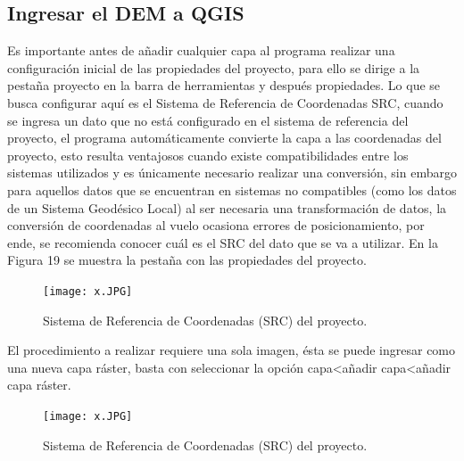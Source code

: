 \documentclass[12pt,hidelinks]{article}
\begin{document}
\subsection{Ingresar el DEM a QGIS}
Es importante antes de añadir cualquier capa al programa realizar una configuración inicial de las propiedades del proyecto, para ello se dirige a la pestaña proyecto en la barra de herramientas y después propiedades. Lo que se busca configurar aquí es el Sistema de Referencia de Coordenadas SRC, cuando se ingresa un dato que no está configurado en el sistema de referencia del proyecto, el programa automáticamente convierte la capa a las coordenadas del proyecto, esto resulta ventajosos cuando existe compatibilidades entre los sistemas utilizados y es únicamente necesario
realizar una conversión, sin embargo para aquellos datos que se encuentran en sistemas no compatibles (como los datos de un Sistema Geodésico Local) al ser necesaria una transformación de datos, la conversión de coordenadas al vuelo ocasiona errores de posicionamiento, por ende, se recomienda conocer cuál es el SRC del dato que se va a utilizar. En la Figura 19 se muestra la pestaña con las propiedades del proyecto.
\begin{figure}[H]
    \centering
    \texttt{[image: x.JPG]}
    \caption{Sistema de Referencia de Coordenadas (SRC) del proyecto.}
    \label{fig:my_label}
\end{figure}

El procedimiento a realizar requiere una sola imagen, ésta se puede ingresar como una nueva
capa ráster, basta con seleccionar la opción capa<añadir capa<añadir capa ráster.

\begin{figure}[H]
    \centering
    \texttt{[image: x.JPG]}
    \caption{Sistema de Referencia de Coordenadas (SRC) del proyecto.}
    \label{fig:my_label}
\end{figure}
\end{document}

